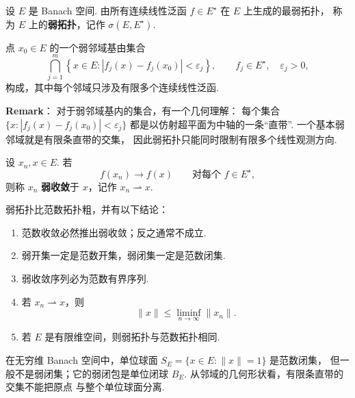 
\begin{definition}[弱拓扑]
    设 $E$ 是 Banach 空间.
    由所有连续线性泛函 $f\in E^\star$ 在 $E$ 上生成的最弱拓扑，
    称为 $E$ 上的\textbf{弱拓扑}，记作
    $\sigma(E,E^\star)$.
\end{definition}

\begin{proposition}[弱邻域基]
    点 $x_0\in E$ 的一个弱邻域基由集合
    \[
        \bigcap_{j=1}^{m}
        \left\{x\in E:
        |f_j(x)-f_j(x_0)|<\varepsilon_j\right\},
        \qquad f_j\in E^\star,\quad \varepsilon_j>0,
    \]
    构成，其中每个邻域只涉及有限多个连续线性泛函.
\end{proposition}

\begin{remarkbox}
    \textbf{Remark}：
    对于弱邻域基内的集合，有一个几何理解：
    每个集合 $\{x:|f_j(x)-f_j(x_0)|<\varepsilon_j\}$
    都是以仿射超平面为中轴的一条“直带”.
    一个基本弱邻域就是有限条直带的交集，
    因此弱拓扑只能同时限制有限多个线性观测方向.
\end{remarkbox}

\begin{definition}[弱收敛]
    设 $x_n,x\in E$.
    若
    \[
        f(x_n)\to f(x)
        \qquad\text{对每个 }f\in E^\star,
    \]
    则称 $x_n$ \textbf{弱收敛}于 $x$，记作
    $x_n\rightharpoonup x$.
\end{definition}

\begin{proposition}[弱拓扑与范数拓扑]
    弱拓扑比范数拓扑粗，并有以下结论：
    \begin{enumerate}
        \item 范数收敛必然推出弱收敛；反之通常不成立.
        \item 弱开集一定是范数开集，弱闭集一定是范数闭集.
        \item 弱收敛序列必为范数有界序列.
        \item 若 $x_n\rightharpoonup x$，则
        \[
            \|x\|\le\liminf_{n\to\infty}\|x_n\|.
        \]
        \item 若 $E$ 是有限维空间，则弱拓扑与范数拓扑相同.
    \end{enumerate}
\end{proposition}

\begin{example}[单位球面]
    在无穷维 Banach 空间中，单位球面
    $S_E=\{x\in E:\|x\|=1\}$ 是范数闭集，
    但一般不是弱闭集；它的弱闭包是单位闭球 $B_E$.
    从邻域的几何形状看，有限条直带的交集不能把原点
    与整个单位球面分离.
\end{example}


